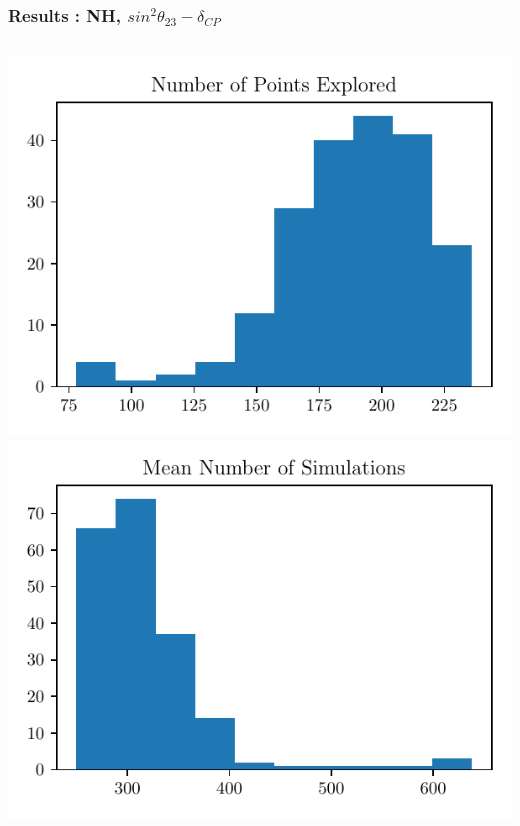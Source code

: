 \documentclass[9pt, aspectratio=169]{beamer}
\begin{document}
\begin{frame}
  \frametitle{Results : NH, $sin^{2}\theta_{23}-\delta_{CP}$}
  \begin{columns}
    \includegraphics[scale=0.6]{figures_final/points.pdf}
    \includegraphics[scale=0.6]{figures_final/sample.pdf}
  \end{columns}
\end{frame}
\end{document}
